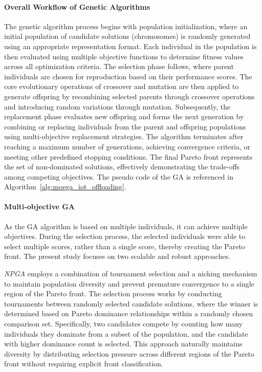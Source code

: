 \documentclass[preprint,12pt]{elsarticle}
\begin{document}
\paragraph{Overall Workflow of Genetic Algorithms}
The genetic algorithm process begins with population initialization, where an initial population of candidate solutions (chromosomes) is randomly generated using an appropriate representation format. Each individual in the population is then evaluated using multiple objective functions to determine fitness values across all optimization criteria. The selection phase follows, where parent individuals are chosen for reproduction based on their performance scores. The core evolutionary operations of crossover and mutation are then applied to generate offspring by recombining selected parents through crossover operations and introducing random variations through mutation. Subsequently, the replacement phase evaluates new offspring and forms the next generation by combining or replacing individuals from the parent and offspring populations using multi-objective replacement strategies. The algorithm terminates after reaching a maximum number of generations, achieving convergence criteria, or meeting other predefined stopping conditions. The final Pareto front represents the set of non-dominated solutions, effectively demonstrating the trade-offs among competing objectives. The pseudo code of the GA is referenced in Algorithm~\ref{alg:moega_iot_offloading}.

\paragraph{Multi-objective GA} As the GA algorithm is based on multiple individuals, it can achieve multiple objectives. During the selection process, the selected individuals were able to select multiple scores, rather than a single score, thereby creating the Pareto front. The present study focuses on two scalable and robust approaches. 

\emph{NPGA} \cite{horn1994npga} employs a combination of tournament selection and a niching mechanism to maintain population diversity and prevent premature convergence to a single region of the Pareto front. The selection process works by conducting tournaments between randomly selected candidate solutions, where the winner is determined based on Pareto dominance relationships within a randomly chosen comparison set. Specifically, two candidates compete by counting how many individuals they dominate from a subset of the population, and the candidate with higher dominance count is selected. This approach naturally maintains diversity by distributing selection pressure across different regions of the Pareto front without requiring explicit front classification.
\end{document}
